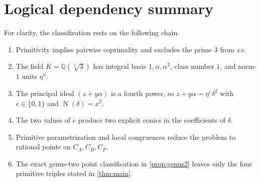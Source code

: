\documentclass[11pt,a4paper]{article}
\newcommand{\Q}{\mathbb Q}
\newcommand{\Norm}{\operatorname{N}}
\newcommand{\etaunit}{\eta}
\begin{document}
\section{Logical dependency summary}

For clarity, the classification rests on the following chain.

\begin{enumerate}
\item Primitivity implies pairwise coprimality and excludes the prime $3$
from $xz$.
\item The field $K=\Q(\sqrt[3]{3})$ has integral basis
$1,\alpha,\alpha^2$, class number $1$, and norm-$1$ units
$\etaunit^n$.
\item The principal ideal $(z+y\alpha)$ is a fourth power, so
$z+y\alpha=\etaunit^e\delta^2$ with $e\in\{0,1\}$ and
$\Norm(\delta)=x^2$.
\item The two values of $e$ produce two explicit conics in the
coefficients of $\delta$.
\item Primitive parametrization and local congruences reduce the problem
to rational points on $C_A,C_B,C_F$.
\item The exact genus-two point classification in \cref{prop:genus2}
leaves only the four primitive triples stated in \cref{thm:main}.
\end{enumerate}
\end{document}
